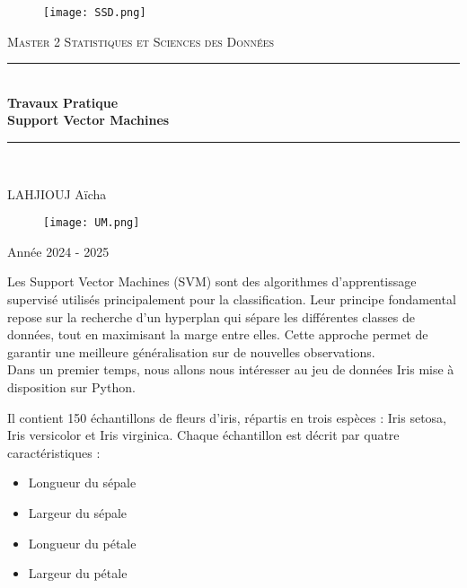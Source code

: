 \documentclass{article}
\author{LAHJIOUJ Aicha }
\date{ }
\begin{document}
\begin{titlepage}

\newcommand{\HRule}{\rule{\linewidth}{0.5mm}}
\center 


\begin{figure}
    \centering
    \texttt{[image: SSD.png]}
\end{figure}



\textsc{\Large Master 2 Statistiques et Sciences des Données }\\[1cm] %
\HRule \\[0.4cm]
{ \huge \bfseries Travaux Pratique \\ Support Vector Machines }\\[0.4cm]
\HRule \\[1.5cm]
\begin{center}
\begin{Large}
LAHJIOUJ Aïcha \\

\hspace{4cm}


\end{Large}
\end{center}
    


\begin{figure}[b]
    \centering
    \texttt{[image: UM.png]}
    \label{UM}
\end{figure}
\begin{Large} Année 2024 - 2025 \\
\end{Large}

\end{titlepage}



Les Support Vector Machines (SVM) sont des algorithmes d'apprentissage supervisé utilisés principalement pour la classification. Leur principe fondamental repose sur la recherche d'un hyperplan qui sépare les différentes classes de données, tout en maximisant la marge entre elles.
Cette approche permet de garantir une meilleure généralisation sur de nouvelles observations.
\\

Dans un premier temps, nous allons nous intéresser au jeu de données Iris mise à disposition sur Python.

Il contient 150 échantillons de fleurs d'iris, répartis en trois espèces : Iris setosa, Iris versicolor et Iris virginica. Chaque échantillon est décrit par quatre caractéristiques :
\begin{itemize}
    \item Longueur du sépale
    \item Largeur du sépale
    \item Longueur du pétale
    \item Largeur du pétale
\end{itemize}
\\
\end{document}
